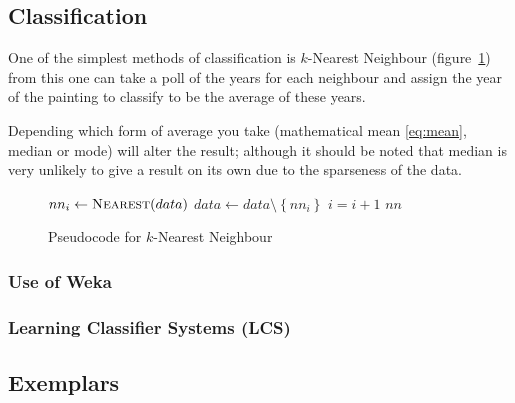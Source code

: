 \subsection{Classification}
One of the simplest methods of classification is $k$-Nearest Neighbour (figure~\ref{fig:knn}) from
this one can take a poll of the years for each neighbour and assign the year of the painting to
classify to be the average of these years.

Depending which form of average you take (mathematical mean \eqref{eq:mean}, median or mode) will
alter the result; although it should be noted that median is very unlikely to give a result on its
own due to the sparseness of the data.

\begin{figure}[h]
\begin{algorithmic}
 
    \State $nn_i \gets \Call{Nearest}{data}$
    \State $data \gets data \setminus \left\{{nn_i}\right\}$
    \State $i = i + 1$
  \EndFor
  \Statex
  \Return $nn$
\EndFunction
\end{algorithmic}
\caption{Pseudocode for $k$-Nearest Neighbour}\label{fig:knn}
\end{figure}

\subsubsection{Use of Weka}

\subsubsection{Learning Classifier Systems (LCS)}

\subsection{Exemplars}



